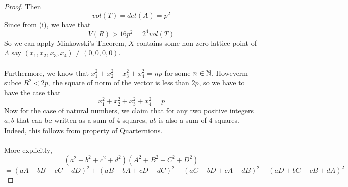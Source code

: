 \begin{proof}
Then
\[vol(T) = det(A) = p^2\]
Since from (i), we have that
\[V(R) > 16p^2 = 2^4 vol(T)\]
So we can apply Minkowski's Theorem, $X$ contains some non-zero lattice point of $\Lambda$ say $(x_1, x_2, x_3, x_4) \neq (0, 0, 0, 0)$.\\\\
Furthermore, we know that $x_1^2 + x_2^2 + x_3^2 + x_4^2 = np$ for some $n \in \mathbb{N}$. Howeverm subce $R^2 < 2p$, the square of norm of the vector is less than $2p$, so we have to have the case that
\[x_1^2 + x_2^2 + x_3^2 + x_4^2 = p\]
Now for the case of natural numbers, we claim that for any two positive integers $a, b$ that can be written as a sum of 4 squares, $ab$ is also a sum of 4 squares. Indeed, this follows from property of Quarternions.\\\\
More explicitly,
\[(a^2 + b^2 + c^2 + d^2)(A^2 + B^2 + C^2 + D^2)\]
\[ = (aA - bB - cC - dD)^2 + (aB + bA + cD - dC)^2 + (aC - bD + cA + dB)^2 + (aD + bC - cB + dA)^2\]
\end{proof}